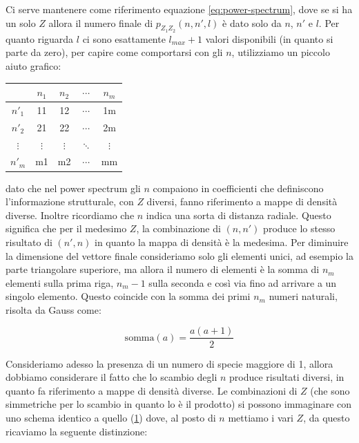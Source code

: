 \documentclass[a4paper,11pt,openany]{book}
\begin{document}
Ci serve mantenere come riferimento equazione \eqref{eq:power-spectrum}, dove se si ha un solo $Z$ allora il numero finale di $p_{Z_1Z_2}(n,n',l)$ è dato solo da $n$, $n'$ e $l$. Per quanto riguarda $l$ ci sono esattamente $l_{max} + 1$ valori disponibili (in quanto si parte da zero), per capire come comportarsi con gli $n$, utilizziamo un piccolo aiuto grafico:

\begin{table}[h]
    \centering
    \begin{tabular}{c|cccc}
                 & $n_1$    & $n_2$    & $\cdots$ & $n_m$\\ \hline
        $n'_1$   &   11     &   12     & $\cdots$ & 1m\\ 
        $n'_2$   &   21     &   22     & $\cdots$ & 2m\\ 
        $\vdots$ & $\vdots$ & $\vdots$ & $\ddots$ & $\vdots$\\ 
        $n'_m$   &   m1     &   m2     & $\cdots$ & mm\\ 
    \end{tabular}
    \label{sch:tabella-coefficienti-n-combinazione-power-spectrum}
\end{table}

dato che nel power spectrum gli $n$ compaiono in coefficienti che definiscono l'informazione strutturale, con $Z$ diversi, fanno riferimento a mappe di densità diverse. Inoltre ricordiamo che $n$ indica una sorta di distanza radiale. Questo significa che per il medesimo $Z$, la combinazione di $(n, n')$ produce lo stesso risultato di $(n', n)$ in quanto la mappa di densità è la medesima. Per diminuire la dimensione del vettore finale consideriamo solo gli elementi unici, ad esempio la parte triangolare superiore, ma allora il numero di elementi è la somma di $n_m$ elementi sulla prima riga, $n_m - 1$ sulla seconda e così via fino ad arrivare a un singolo elemento. Questo coincide con la somma dei primi $n_m$ numeri naturali, risolta da Gauss come:

\begin{equation}
    \mathrm{somma}(a) = \frac{a(a + 1)}{2}
    \label{eq:somma-gauss-naturali}
\end{equation}

Consideriamo adesso la presenza di un numero di specie maggiore di 1, allora dobbiamo considerare il fatto che lo scambio degli $n$ produce risultati diversi, in quanto fa riferimento a mappe di densità diverse. Le combinazioni di $Z$ (che sono simmetriche per lo scambio in quanto lo è il prodotto) si possono immaginare con uno schema identico a quello (\ref{sch:tabella-coefficienti-n-combinazione-power-spectrum}) dove, al posto di $n$ mettiamo i vari $Z$, da questo ricaviamo la seguente distinzione:
\end{document}
